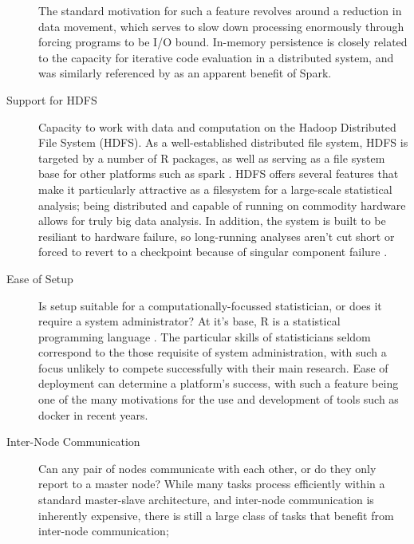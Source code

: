 \documentclass[a4paper,10pt]{article}
\begin{document}
\begin{description}
	      The standard motivation for such a feature revolves around a
	      reduction in data movement, which serves to slow down
	      processing enormously through forcing programs to be I/O bound.
	      In-memory persistence is closely related to the capacity for
	      iterative code evaluation in a distributed system, and was
	      similarly referenced by \citeauthor{zaharia2010spark} as an
	      apparent benefit of Spark.
	\item[Support for HDFS]
	      Capacity to work with data and computation on the Hadoop
	      Distributed File System (HDFS).
	      As a well-established distributed file system, HDFS is targeted
	      by a number of R packages, as well as serving as a file
	      system base for other platforms such as spark
	      \cite{analytics:_rhadoop_wiki} \cite{deltarho:_rhipe}
	      \cite{urbanek20} \cite{zaharia2016apache}.
	      HDFS offers several features that make it particularly
	      attractive as a filesystem for a large-scale statistical
	      analysis;
	      being distributed and capable of running on commodity hardware
	      allows for truly big data analysis.
	      In addition, the system is built to be resiliant to hardware
	      failure, so long-running analyses aren't cut short or forced to
	      revert to a checkpoint because of singular component failure
	      \cite{shvachko2010hadoop}.
	\item[Ease of Setup]
	      Is setup suitable for a computationally-focussed
	      statistician, or does it require a system administrator?
	      At it's base, R is a statistical programming language
	      \cite{rcore2020intro}.
	      The particular skills of statisticians seldom correspond to the
	      those requisite of system administration, with such a focus
	      unlikely to compete successfully with their main research.
	      Ease of deployment can determine a platform's success, with
	      such a feature being one of the many motivations for the use
	      and development of tools such as docker in recent years.
	\item[Inter-Node Communication]
	      Can any pair of nodes communicate with each other, or do they
	      only report to a master node?
	      While many tasks process efficiently within a standard
	      master-slave architecture, and inter-node communication is
	      inherently expensive, there is still a large class of tasks
	      that benefit from inter-node communication\cite{walker1996mpi};

\end{description}
\end{document}
